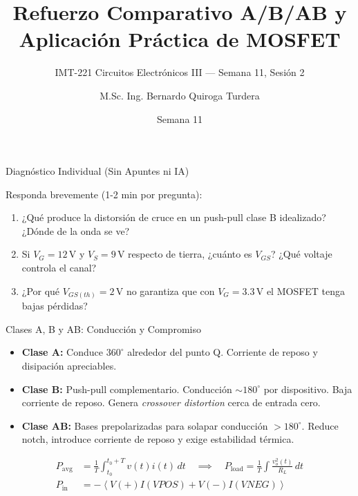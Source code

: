 \documentclass[aspectratio=169, table]{beamer}
\title[A/B/AB y MOSFET]{Refuerzo Comparativo A/B/AB y Aplicación Práctica de MOSFET}
\subtitle{IMT-221 Circuitos Electrónicos III — Semana 11, Sesión 2}
\author[B. Quiroga Turdera]{M.Sc. Ing. Bernardo Quiroga Turdera}
\institute[UCB Tarija]{Universidad Católica Boliviana ``San Pablo'' — Sede Tarija}
\date{Semana 11}
\begin{document}
\begin{frame}
    \titlepage
\end{frame}

\begin{frame}{Diagnóstico Individual (Sin Apuntes ni IA)}
    \begin{tcolorbox}[colback=ucbblue!5, colframe=ucbblue, title=Evaluación de Familiaridad vs. Comprensión {}]
        Responda brevemente (1-2 min por pregunta):
    \end{tcolorbox}
    \begin{enumerate}
        \item ¿Qué produce la distorsión de cruce en un push-pull clase B idealizado? ¿Dónde de la onda se ve?
        \item Si $V_G = 12\,\text{V}$ y $V_S = 9\,\text{V}$ respecto de tierra, ¿cuánto es $V_{GS}$? ¿Qué voltaje controla el canal?
        \item ¿Por qué $V_{GS(th)} = 2\,\text{V}$ no garantiza que con $V_G = 3.3\,\text{V}$ el MOSFET tenga bajas pérdidas?
    \end{enumerate}
\end{frame}

\begin{frame}{Clases A, B y AB: Conducción y Compromiso}
    \begin{itemize}
        \item \textbf{Clase A:} Conduce $360^\circ$ alrededor del punto Q. Corriente de reposo y disipación apreciables.
        \item \textbf{Clase B:} Push-pull complementario. Conducción $\sim 180^\circ$ por dispositivo. Baja corriente de reposo. Genera \textit{crossover distortion} cerca de entrada cero.
        \item \textbf{Clase AB:} Bases prepolarizadas para solapar conducción $>180^\circ$. Reduce notch, introduce corriente de reposo y exige estabilidad térmica.
    \end{itemize}
    
    \begin{tcolorbox}[colback=white, colframe=gray, title=Desarrollo de Potencia {}]
        \vspace{-0.3cm}
        \begin{align*}
            P_{\mathrm{avg}} &= \frac{1}{T}\int_{t_0}^{t_0+T}v(t)i(t)\,dt \quad \implies \quad P_{\mathrm{load}} = \frac{1}{T}\int \frac{v_o^2(t)}{R_L}\,dt \text{} \\
            P_{\mathrm{in}} &= -\left\langle V(+)I(VPOS) + V(-)I(VNEG) \right\rangle \text{}
        \end{align*}
    \end{tcolorbox}
\end{frame}
\end{document}
